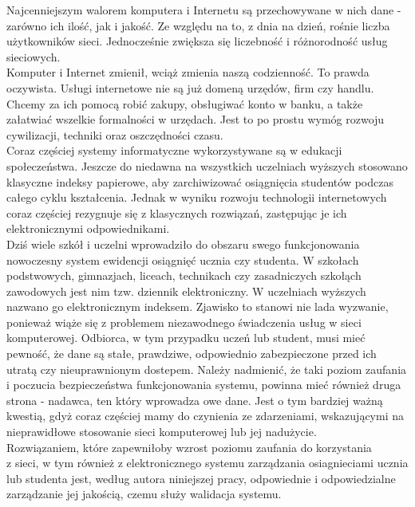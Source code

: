 \documentclass[brudnopis]{xmgr}
\begin{document}
\indent \indent \textcolor{wa}{Najcenniejszym walorem komputera i Internetu są przechowywane w nich dane - zarówno
ich ilość, jak i jakość. Ze względu na to, z dnia na dzień, rośnie liczba
użytkowników sieci. Jednocześnie zwiększa się liczebność i różnorodność usług
sieciowych.}
\\
\indent \textcolor{wa}{Komputer i Internet zmienił, wciąż zmienia naszą codzienność. To prawda oczywista.
Usługi internetowe nie są już domeną urzędów, firm czy handlu. Chcemy za ich pomocą
robić zakupy, obsługiwać konto w banku, a także załatwiać wszelkie formalności w
urzędach. Jest to po prostu wymóg rozwoju cywilizacji, techniki oraz oszczędności
czasu.}
\\
\indent \textcolor{wa}{Coraz częściej systemy informatyczne wykorzystywane są w edukacji społeczeństwa.
Jeszcze do niedawna na wszystkich uczelniach wyższych stosowano klasyczne indeksy
papierowe, aby zarchiwizować osiągnięcia studentów podczas całego cyklu kształcenia.
Jednak w wyniku rozwoju technologii internetowych coraz częściej rezygnuje się
z klasycznych rozwiązań, zastępując je ich elektronicznymi odpowiednikami.}
\\
\indent \textcolor{wb}{Dziś wiele szkół i uczelni wprowadziło do obszaru swego funkcjonowania nowoczesny
system ewidencji osiągnięć ucznia czy studenta. W szkołach podstwowych, gimnazjach,
liceach, technikach czy zasadniczych szkołąch zawodowych jest nim tzw. dziennik
elektroniczny. W uczelniach wyższych  nazwano go elektronicznym indeksem. Zjawisko
to stanowi nie lada wyzwanie, ponieważ wiąże się z problemem niezawodnego świadczenia
usług w sieci komputerowej. Odbiorca, w tym przypadku uczeń lub student, musi mieć
pewność, że dane są stałe, prawdziwe, odpowiednio zabezpieczone przed ich utratą
czy nieuprawnionym dostepem. Należy nadmienić, że taki poziom zaufania i poczucia
bezpieczeństwa funkcjonowania systemu, powinna mieć również druga strona - nadawca,
ten który wprowadza owe dane. Jest o tym bardziej ważną kwestią, gdyż coraz częściej
mamy do czynienia ze zdarzeniami, wskazującymi na nieprawidłowe stosowanie sieci
komputerowej lub jej nadużycie.}
\\
\indent \textcolor{wa}{Rozwiązaniem, które zapewniłoby wzrost poziomu zaufania do korzystania
\\
z sieci,
w tym również z elektronicznego systemu zarządzania osiagnieciami ucznia lub studenta
jest, według autora niniejszej pracy, odpowiednie i odpowiedzialne zarządzanie jej
jakością, czemu służy walidacja systemu.}
\\
\end{document}
